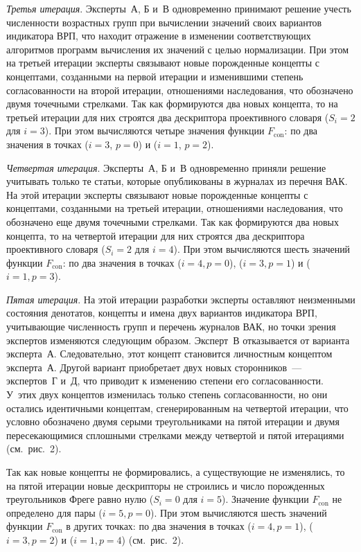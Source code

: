 \begin{multicols}{2}
   \textit{Третья итерация}. Эксперты~{А}, {Б} и~{В} одновременно 
принимают решение учесть численности возрастных групп при вычислении значений своих 
вариантов индикатора ВРП, что находит отражение в изменении соответствующих 
алгоритмов программ вычисления их значений с целью нормализации. При этом на третьей 
итерации эксперты связывают новые порожденные концепты с концептами, созданными на 
первой итерации и изменившими степень согласованности на второй итерации, 
отношениями наследования, что обозначено двумя точечными стрелками. Так как 
формируются два новых концепта, то на третьей итерации для них строятся два дескриптора 
проективного словаря ($S_i = 2$ для $i = 3$). При этом вычисляются четыре значения 
функции $F_{\mathrm{con}}$: по два значения в точках ($i = 3$, $p = 0$) и ($i = 1$, $p = 2$).


   \smallskip
   
   \textit{Четвертая итерация}. Эксперты~{А}, {Б} и~{В} одновременно 
приняли решение учитывать только те статьи, которые опубликованы в журналах из перечня 
ВАК. На этой итерации эксперты связывают новые порожденные концепты с концептами, 
созданными на третьей итерации, отношениями наследования, что обозначено еще двумя 
точечными стрелками. Так как формируются два новых концепта, то на четвертой итерации 
для них строятся два дескриптора проективного словаря ($S_i = 2$ для $i = 4$). При этом 
вычисляются шесть значений функции $F_{\mathrm{con}}$: по два значения в точках ($i = 4, p = 0$), 
($i = 3, p = 1$) и ($i = 1, p = 3$).
   
   \smallskip
   
   \textit{Пятая итерация}. На этой итерации разработки эксперты оставляют неизменными 
состояния денотатов, концепты и имена двух вариантов индикатора ВРП, учитывающие 
численность групп и перечень журналов ВАК, но точки зрения экспертов изменяются 
следующим образом. Эксперт~{В} отказывается от варианта эксперта~{А}. 
Следовательно, этот концепт становится личностным концептом эксперта~{А}. Другой 
вариант приобретает двух новых сторонников~--- экспертов~{Г} и~{Д}, что 
приводит к изменению степени его согласованности. У~этих двух концептов изменилась 
только степень согласованности, но они остались идентичными концептам, 
сгенерированным на четвертой итерации, что условно обозначено двумя серыми 
треугольниками на пятой итерации и двумя пересекающимися сплошными стрелками между 
четвертой и пятой итерациями (см.\ рис.~2).
   
   Так как новые концепты не формировались, а существующие не изменялись, то на пятой 
итерации новые дескрипторы не строились и число по\-рож\-ден\-ных треугольников Фреге 
равно нулю ($S_i = 0$ для $i = 5$). Значение функции $F_{\mathrm{con}}$ не определено для пары 
($i = 5, p = 0$). При этом вычисляются шесть значений функции $F_{\mathrm{con}}$ в других точках: 
по два значения в точках ($i = 4, p = 1$), ($i = 3, p = 2$) и ($i = 1, p = 4$) (см.\ рис.~2).
   

\end{multicols}
